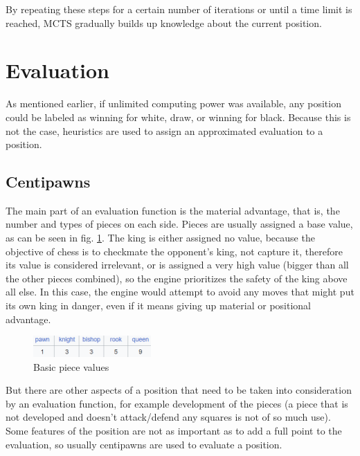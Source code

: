 By repeating these steps for a certain number of iterations or until a time limit is reached, MCTS gradually builds up knowledge about the current position.

\section{Evaluation}
\label{sec:ch2sec3}

As mentioned earlier, if unlimited computing power was available, any position could be labeled as winning for white, draw, or winning for black. Because this is not the case, heuristics are used to assign an approximated evaluation to a position.

\subsection{Centipawns}
\label{subsec:ch2sec3subsec1}

The main part of an evaluation function is the material advantage, that is, the number and types of pieces on each side. Pieces are usually assigned a base value, as can be seen in fig. \ref{fig:basicPieceValues}. The king is either assigned no value, because the objective of chess is to checkmate the opponent's king, not capture it, therefore its value is considered irrelevant, or is assigned a very high value (bigger than all the other pieces combined), so the engine prioritizes the safety of the king above all else. In this case, the engine would attempt to avoid any moves that might put its own king in danger, even if it means giving up material or positional advantage.

\begin{figure}[h]
    \centering
    \includegraphics[width=0.4\textwidth]{figures/piece-basic-values.png}
    \caption{Basic piece values}
    \label{fig:basicPieceValues}
\end{figure}

But there are other aspects of a position that need to be taken into consideration by an evaluation function, for example development of the pieces (a piece that is not developed and doesn't attack/defend any squares is not of so much use). Some features of the position are not as important as to add a full point to the evaluation, so usually centipawns are used to evaluate a position. 


